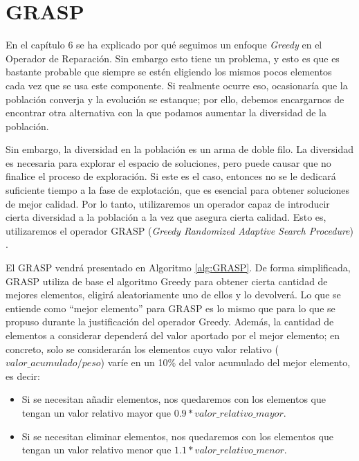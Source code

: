 \section{GRASP}

En el capítulo 6 se ha explicado por qué seguimos un enfoque \textit{Greedy} en el Operador de Reparación. 
Sin embargo esto tiene un problema, y esto es que es bastante probable que siempre se estén eligiendo los mismos pocos elementos cada vez que se usa este componente. 
Si realmente ocurre eso, ocasionaría que la población converja y la evolución se estanque; por ello, debemos encargarnos de encontrar otra alternativa con la que podamos aumentar la diversidad de la población. 

Sin embargo, la diversidad en la población es un arma de doble filo. 
La diversidad es necesaria para explorar el espacio de soluciones, pero puede causar que no finalice el proceso de exploración. 
Si este es el caso, entonces no se le dedicará suficiente tiempo a la fase de explotación, que es esencial para obtener soluciones de mejor calidad. 
Por lo tanto, utilizaremos un operador capaz de introducir cierta diversidad a la población a la vez que asegura cierta calidad. 
Esto es, utilizaremos el operador GRASP (\textit{Greedy Randomized Adaptive Search Procedure}) \parencite{herrera-poyatosGeneticMemeticAlgorithm2017}. 

El GRASP vendrá presentado en Algoritmo \ref{alg:GRASP}. 
De forma simplificada, GRASP utiliza de base el algoritmo Greedy para obtener cierta cantidad de mejores elementos, eligirá aleatoriamente uno de ellos y lo devolverá. 
Lo que se entiende como ``mejor elemento'' para GRASP es lo mismo que para lo que se propuso durante la justificación del operador Greedy. 
Además, la cantidad de elementos a considerar dependerá del valor aportado por el mejor elemento; en concreto, solo se considerarán los elementos cuyo valor relativo ($valor\_acumulado/peso$) varíe en un 10\% del valor acumulado del mejor elemento, es decir:
\begin{itemize}
	\item Si se necesitan añadir elementos, nos quedaremos con los elementos que tengan un valor relativo mayor que $0.9*valor\_relativo\_mayor$.
	\item Si se necesitan eliminar elementos, nos quedaremos con los elementos que tengan un valor relativo menor que $1.1*valor\_relativo\_menor$.
\end{itemize}

